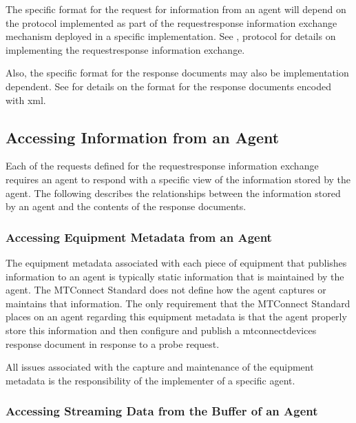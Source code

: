 The specific format for the \gls{request} for information from an \gls{agent} will depend on the \gls{protocol} implemented as part of the \gls{requestresponse} information exchange mechanism deployed in a specific implementation.  See , \gls{protocol} for details on implementing the \gls{requestresponse} information exchange.

Also, the specific format for the \glspl{response document} may also be implementation dependent.   See  for details on the format for the \glspl{response document} encoded with \gls{xml}.

\subsection{Accessing Information from an Agent}

Each of the \glspl{request} defined for the \gls{requestresponse} information exchange requires an \gls{agent} to respond with a specific view of the information stored by the \gls{agent}.  The following describes the relationships between the information stored by an \gls{agent} and the contents of the \glspl{response document}.

\subsubsection{Accessing Equipment Metadata from an Agent}

The \gls{equipment metadata} associated with each piece of equipment that publishes information to an \gls{agent} is typically static information that is maintained by the \gls{agent}.  The MTConnect Standard does not define how the \gls{agent} captures or maintains that information.  The only requirement that the MTConnect Standard places on an \gls{agent} regarding this \gls{equipment metadata} is that the \gls{agent} properly store this information and then configure and publish a \gls{mtconnectdevices response document} in response to a \gls{probe request}.

All issues associated with the capture and maintenance of the \gls{equipment metadata} is the responsibility of the implementer of a specific \gls{agent}.

\subsubsection{Accessing Streaming Data from the Buffer of an Agent}

